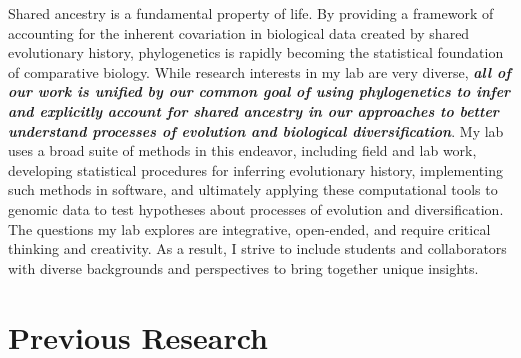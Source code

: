 Shared ancestry is a fundamental property of life.
By providing a framework of accounting for the inherent
covariation
in biological data created by shared evolutionary history,
phylogenetics is rapidly becoming the statistical foundation of comparative
biology.
While research interests in my lab
are very diverse,
\textbf{\textit{all of our work is unified by our common goal of using
        phylogenetics to infer and explicitly account for shared ancestry in
        our approaches to better understand
        processes of evolution and biological diversification}}.
My lab uses a broad suite of methods in this endeavor, including
field and lab work,
developing statistical procedures for inferring evolutionary history,
implementing such methods in software,
and ultimately applying these computational tools to genomic data to test
hypotheses about processes of evolution and diversification.
The questions my lab explores are integrative, open-ended, and require critical
thinking and creativity.
As a result,
I strive to include students and collaborators with diverse backgrounds and
perspectives to bring together unique insights.

\section*{Previous Research}
